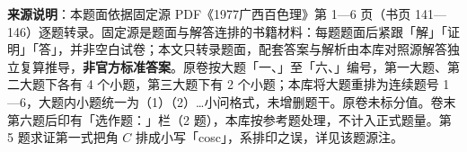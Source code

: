 


\begin{gktip}
\textbf{来源说明}：本题面依据固定源 PDF《1977广西百色理》第 1—6 页（书页 141—146）逐题转录。固定源是题面与解答连排的书籍材料：每题题面后紧跟「解」「证明」「答」，并非空白试卷；本文只转录题面，配套答案与解析由本库对照源解答独立复算推导，\textbf{非官方标准答案}。原卷按大题「一、」至「六、」编号，第一大题、第二大题下各有 4 个小题，第三大题下有 2 个小题；本库将大题重排为连续题号 1—6，大题内小题统一为（1）（2）…小问格式，未增删题干。原卷未标分值。卷末第六题后印有「选作题：」栏（2 题），本库按参考题处理，不计入正式题量。第 5 题求证第一式把角 $C$ 排成小写「cosc」，系排印之误，详见该题源注。
\end{gktip}

